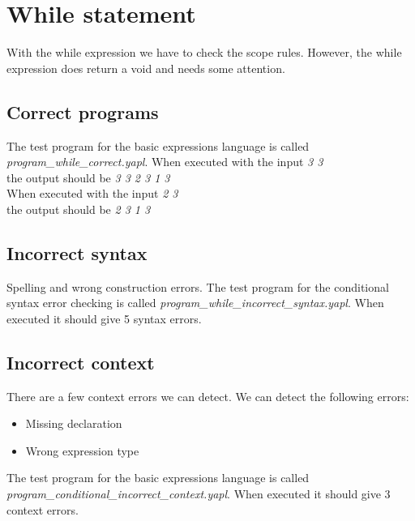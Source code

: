 \section{While statement}
With the while expression we have to check the scope rules. However, the while expression does return a void and needs some attention. 
\subsection{Correct programs}
The test program for the basic expressions language is called \emph{program_while_correct.yapl}. When executed with the input \emph{3 3} \\the output should be \emph{3 3 2 3 1 3}\\
When executed with the input \emph{2 3} \\the output should be \emph{2 3 1 3}
\subsection{Incorrect syntax}
Spelling and wrong construction errors.
The test program for the conditional syntax error checking is called  \emph{program_while_incorrect_syntax.yapl}. When executed it should give 5 syntax errors.
\subsection{Incorrect context}
There are a few context errors we can detect. We can detect the following errors:
\begin{itemize}
\item Missing declaration
\item Wrong expression type
\end{itemize}
The test program for the basic expressions language is called \emph{program_conditional_incorrect_context.yapl}. When executed it should give 3 context errors.